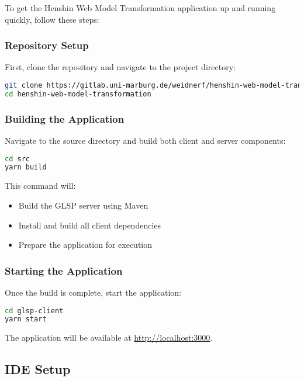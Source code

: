 To get the Henshin Web Model Transformation application up and running quickly, follow these steps:

\subsubsection{Repository Setup}

First, clone the repository and navigate to the project directory:

\begin{lstlisting}[language=bash]
git clone https://gitlab.uni-marburg.de/weidnerf/henshin-web-model-transformation.git
cd henshin-web-model-transformation
\end{lstlisting}

\subsubsection{Building the Application}

Navigate to the source directory and build both client and server components:

\begin{lstlisting}[language=bash]
cd src
yarn build
\end{lstlisting}

This command will:
\begin{itemize}
    \item Build the GLSP server using Maven
    \item Install and build all client dependencies
    \item Prepare the application for execution
\end{itemize}

\subsubsection{Starting the Application}

Once the build is complete, start the application:

\begin{lstlisting}[language=bash]
cd glsp-client
yarn start
\end{lstlisting}

The application will be available at \url{http://localhost:3000}.

\subsection{IDE Setup}
\label{subsec:ide_setup}

